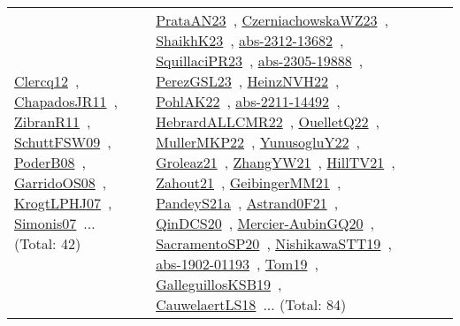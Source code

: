 {\begin{longtable}{lp{3cm}>{\raggedright\arraybackslash}p{6cm}>{\raggedright\arraybackslash}p{6cm}>{\raggedright\arraybackslash}p{8cm}}
\href{works/Clercq12.pdf}{Clercq12}~\cite{Clercq12}, \href{works/ChapadosJR11.pdf}{ChapadosJR11}~\cite{ChapadosJR11}, \href{works/ZibranR11.pdf}{ZibranR11}~\cite{ZibranR11}, \href{works/SchuttFSW09.pdf}{SchuttFSW09}~\cite{SchuttFSW09}, \href{works/PoderB08.pdf}{PoderB08}~\cite{PoderB08}, \href{works/GarridoOS08.pdf}{GarridoOS08}~\cite{GarridoOS08}, \href{works/KrogtLPHJ07.pdf}{KrogtLPHJ07}~\cite{KrogtLPHJ07}, \href{works/Simonis07.pdf}{Simonis07}~\cite{Simonis07}... (Total: 42) & \href{works/PrataAN23.pdf}{PrataAN23}~\cite{PrataAN23}, \href{works/CzerniachowskaWZ23.pdf}{CzerniachowskaWZ23}~\cite{CzerniachowskaWZ23}, \href{works/ShaikhK23.pdf}{ShaikhK23}~\cite{ShaikhK23}, \href{works/abs-2312-13682.pdf}{abs-2312-13682}~\cite{abs-2312-13682}, \href{works/SquillaciPR23.pdf}{SquillaciPR23}~\cite{SquillaciPR23}, \href{works/abs-2305-19888.pdf}{abs-2305-19888}~\cite{abs-2305-19888}, \href{works/PerezGSL23.pdf}{PerezGSL23}~\cite{PerezGSL23}, \href{works/HeinzNVH22.pdf}{HeinzNVH22}~\cite{HeinzNVH22}, \href{works/PohlAK22.pdf}{PohlAK22}~\cite{PohlAK22}, \href{works/abs-2211-14492.pdf}{abs-2211-14492}~\cite{abs-2211-14492}, \href{works/HebrardALLCMR22.pdf}{HebrardALLCMR22}~\cite{HebrardALLCMR22}, \href{works/OuelletQ22.pdf}{OuelletQ22}~\cite{OuelletQ22}, \href{works/MullerMKP22.pdf}{MullerMKP22}~\cite{MullerMKP22}, \href{works/YunusogluY22.pdf}{YunusogluY22}~\cite{YunusogluY22}, \href{works/Groleaz21.pdf}{Groleaz21}~\cite{Groleaz21}, \href{works/ZhangYW21.pdf}{ZhangYW21}~\cite{ZhangYW21}, \href{works/HillTV21.pdf}{HillTV21}~\cite{HillTV21}, \href{works/Zahout21.pdf}{Zahout21}~\cite{Zahout21}, \href{works/GeibingerMM21.pdf}{GeibingerMM21}~\cite{GeibingerMM21}, \href{works/PandeyS21a.pdf}{PandeyS21a}~\cite{PandeyS21a}, \href{works/Astrand0F21.pdf}{Astrand0F21}~\cite{Astrand0F21}, \href{works/QinDCS20.pdf}{QinDCS20}~\cite{QinDCS20}, \href{works/Mercier-AubinGQ20.pdf}{Mercier-AubinGQ20}~\cite{Mercier-AubinGQ20}, \href{works/SacramentoSP20.pdf}{SacramentoSP20}~\cite{SacramentoSP20}, \href{works/NishikawaSTT19.pdf}{NishikawaSTT19}~\cite{NishikawaSTT19}, \href{works/abs-1902-01193.pdf}{abs-1902-01193}~\cite{abs-1902-01193}, \href{works/Tom19.pdf}{Tom19}~\cite{Tom19}, \href{works/GalleguillosKSB19.pdf}{GalleguillosKSB19}~\cite{GalleguillosKSB19}, \href{works/CauwelaertLS18.pdf}{CauwelaertLS18}~\cite{CauwelaertLS18}... (Total: 84)\\

\end{longtable}}
